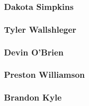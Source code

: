 \documentclass[11pt]{article}
\begin{document}
\subsubsection{Dakota Simpkins}
\label{sec:org462d10c}
\subsubsection{Tyler Wallshleger}
\label{sec:orge8392a7}
\subsubsection{Devin O'Brien}
\label{sec:orgf1fac83}
\subsubsection{Preston Williamson}
\label{sec:orgeffb465}
\subsubsection{Brandon Kyle}
\label{sec:org13e545e}
\end{document}
